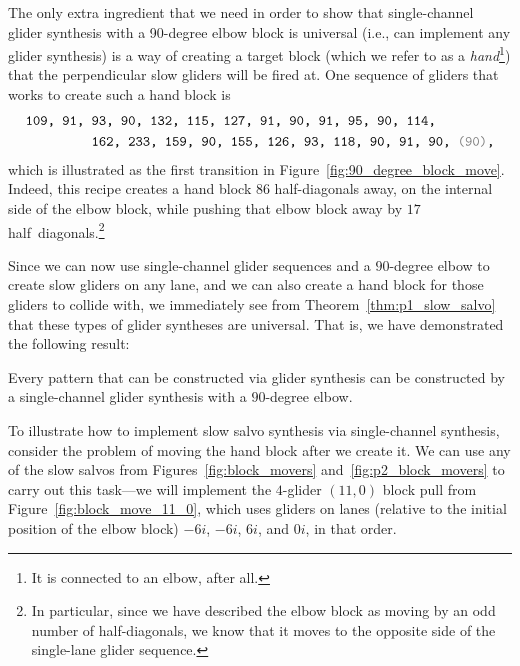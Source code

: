 The only extra ingredient that we need in order to show that single-channel glider synthesis with a 90-degree elbow block is universal (i.e., can implement any glider synthesis) is a way of creating a target block (which we refer to as a \emph{hand}\footnote{It is connected to an elbow, after all.}) that the perpendicular slow gliders will be fired at. One sequence of gliders that works to create such a hand block is
\begin{align}\begin{split}\label{eq:make_hand_90_deg}
	& \text{\texttt{109, 91, 93, 90, 132, 115, 127, 91, 90, 91, 95, 90, 114,}} \\
	& \text{\texttt{~~~~~~~~~162, 233, 159, 90, 155, 126, 93, 118, 90, 91, 90, {\color{gray}(90)},}}
\end{split}\end{align}
which is illustrated as the first transition in Figure~\ref{fig:90_degree_block_move}. Indeed, this recipe creates a hand block $86$ half-diagonals away, on the internal side of the elbow block, while pushing that elbow block away by $17$ half~diagonals.\footnote{In particular, since we have described the elbow block as moving by an odd number of half-diagonals, we know that it moves to the opposite side of the single-lane glider sequence.}

Since we can now use single-channel glider sequences and a $90$-degree elbow to create slow gliders on any lane, and we can also create a hand block for those gliders to collide with, we immediately see from Theorem~\ref{thm:p1_slow_salvo} that these types of glider syntheses are universal. That is, we have demonstrated the following result:

\begin{theorem}\label{thm:single_channel_90_degree}
	Every pattern that can be constructed via glider synthesis can be constructed by a single-channel glider synthesis with a $90$-degree elbow.
\end{theorem}

To illustrate how to implement slow salvo synthesis via single-channel synthesis, consider the problem of moving the hand block after we create it. We can use any of the slow salvos from Figures~\ref{fig:block_movers} and~\ref{fig:p2_block_movers} to carry out this task---we will implement the $4$-glider $(11,0)$ block pull from Figure~\ref{fig:block_move_11_0}, which uses gliders on lanes (relative to the initial position of the elbow block) $-6i$, $-6i$, $6i$, and $0i$, in that order.

